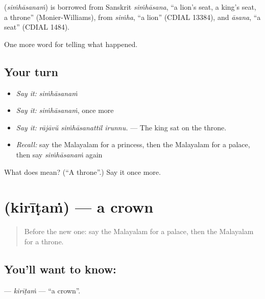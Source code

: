 \begin{cousinweb}
\textbf{} (\emph{siṁhāsanaṁ}) is borrowed from Sanskrit \emph{siṁhāsana}, \textquotedblleft{}a lion's seat, a king's seat, a throne\textquotedblright{} (Monier-Williams), from \emph{siṁha}, \textquotedblleft{}a lion\textquotedblright{} (CDIAL 13384), and \emph{āsana}, \textquotedblleft{}a seat\textquotedblright{} (CDIAL 1484).
\end{cousinweb}

\begin{grammarlens}[title={What you've built}]
One more word for telling what happened.
\end{grammarlens}

\subsection*{Your turn}
\begin{itemize}
\raggedright
  \item \emph{Say it:} \emph{siṁhāsanaṁ}
  \item \emph{Say it:} \emph{siṁhāsanaṁ}, once more
  \item \emph{Say it:} \emph{rājāvŭ siṁhāsanattil irunnu.} — The king sat on the throne.
  \item \emph{Recall:} say the Malayalam for a princess, then the Malayalam for a palace, then say \emph{siṁhāsanaṁ} again
\end{itemize}

\begin{tcolorbox}[breakable,colback=teal!4,colframe=teal!35!black,title={Before you move on}]
What does  mean? (\textquotedblleft{}A throne\textquotedblright{}.) Say it once more.
\end{tcolorbox}
\section[\texorpdfstring{\ml{കിരീടം} (kirīṭaṁ)}{കിരീടം (kirīṭaṁ)}]{ (kirīṭaṁ) — a crown}

\label{lesson:ML-C398-kiritam}



\begin{quote}
Before the new one: say the Malayalam for a palace, then the Malayalam for a throne.
\end{quote}

\subsection*{You'll want to know: }
\textbf{} — \emph{kirīṭaṁ} — \textquotedblleft{}a crown\textquotedblright{}.

